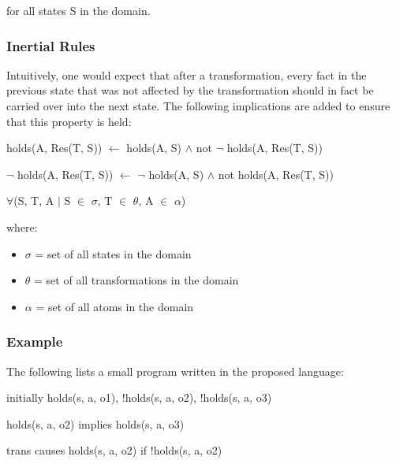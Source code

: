 \documentclass[a4paper]{article}
\begin{document}
        for all states S in the domain.

      \subsubsection{Inertial Rules}

        Intuitively, one would expect that after a transformation, every fact
        in the previous state that was not affected by the transformation
        should in fact be carried over into the next state. The following
        implications are added to ensure that this property is held:

        \begin{list}{}{}
          \item
            holds(A, Res(T, S)) $\leftarrow$ holds(A, S) $\land$ not $\lnot$ 
            holds(A, Res(T, S))
          \item 
            $\lnot$ holds(A, Res(T, S)) $\leftarrow$ $\lnot$ holds(A, S) 
            $\land$ not holds(A, Res(T, S))
        \end{list}

        $\forall$(S, T, A $\mid$ S $\in$ $\sigma$, T $\in$ $\theta$, A $\in$ 
        $\alpha$)

        where: 

        \begin{itemize}
          \item $\sigma$ = set of all states in the domain
          \item $\theta$ = set of all transformations in the domain
          \item $\alpha$ = set of all atoms in the domain
        \end{itemize}

      \subsubsection{Example}

        The following lists a small program written in the proposed language:

        \begin{list}{}{}
          \item initially holds(s, a, o1), !holds(s, a, o2), !holds(s, a, o3)
          \item holds(s, a, o2) implies holds(s, a, o3)
          \item trans causes holds(s, a, o2) if !holds(s, a, o2)
        \end{list}
\end{document}
